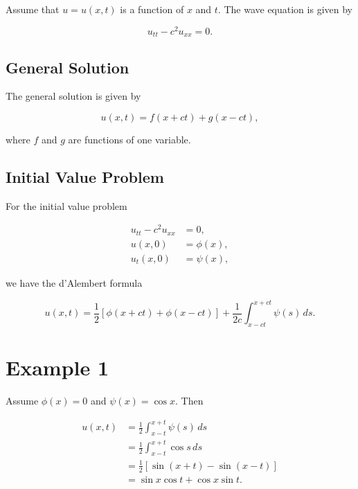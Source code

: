 \documentclass[11pt]{article}
\begin{document}
Assume that \( u = u(x, t) \) is a function of \( x \) and \( t \). The wave equation is given by

\begin{equation}
    u_{tt} - c^2 u_{xx} = 0.
\end{equation}

\subsection*{General Solution}

The general solution is given by

\begin{equation}
    u(x, t) = f(x + ct) + g(x - ct),
\end{equation}

where \( f \) and \( g \) are functions of one variable.

\subsection*{Initial Value Problem}

For the initial value problem

\begin{align}
    u_{tt} - c^2 u_{xx} &= 0, \\
    u(x, 0) &= \phi(x), \\
    u_t(x, 0) &= \psi(x),
\end{align}

we have the d'Alembert formula

\begin{equation}
    u(x, t) = \frac{1}{2} \left[ \phi(x + ct) + \phi(x - ct) \right] + \frac{1}{2c} \int_{x-ct}^{x+ct} \psi(s) \, ds.
\end{equation}





\section*{Example 1}

Assume $\phi(x) = 0$ and $\psi(x) = \cos x$. Then

\begin{align*}
    u(x, t) &= \frac{1}{2} \int_{x-t}^{x+t} \psi(s) \, ds \\
    &= \frac{1}{2} \int_{x-t}^{x+t} \cos s \, ds \\
    &= \frac{1}{2} \left[ \sin(x+t) - \sin(x-t) \right] \\
    &= \sin x \cos t + \cos x \sin t.
\end{align*}
\end{document}
